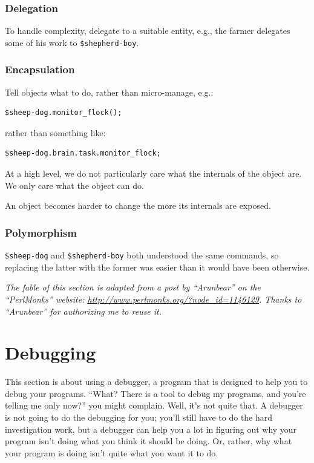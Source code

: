 \subsubsection{Delegation}

To handle complexity, delegate to a suitable 
entity, e.g., the farmer delegates some of his 
work to \verb'$shepherd-boy'.

\subsubsection{Encapsulation}

Tell objects what to do, rather than micro-manage, e.g.:

\begin{verbatim}
$sheep-dog.monitor_flock();
\end{verbatim}

rather than something like:

\begin{verbatim}
$sheep-dog.brain.task.monitor_flock;
\end{verbatim}

At a high level, we do not particularly care 
what the internals of the object are. We only 
care what the object can do.

An object becomes harder to change the 
more its internals are exposed.

\subsubsection{Polymorphism}
\verb'$sheep-dog' and \verb'$shepherd-boy' both 
understood the same commands, so replacing the 
latter with the former was easier than it would 
have been otherwise. 

\emph{The fable of this section is adapted 
from a post by ``Arunbear'' on the ``PerlMonks'' 
website: \url{http://www.perlmonks.org/?node_id=1146129}. 
Thanks to ``Arunbear'' for authorizing me 
to reuse it.}


\section{Debugging}
\label{perl-debugger}

This section is about using a debugger, a program that is 
designed to help you to debug your programs. ``What? There 
is a tool to debug my programs, and you're telling me only 
now?'' you might complain. Well, it's not quite that. A debugger 
is not going to do the debugging for you; you'll still have 
to do the hard investigation work, but a debugger can help 
you a lot in figuring out why your program isn't doing 
what you think it should be doing. Or, rather, why what your 
program is doing isn't quite what you want it to do.

